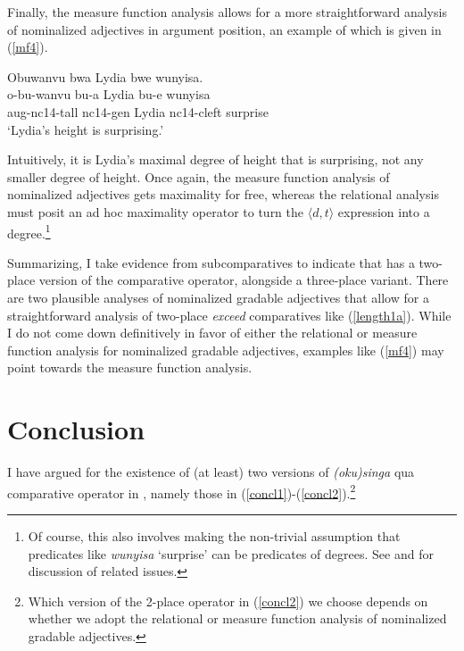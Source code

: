 \documentclass[output=paper,
modfonts
]{langscibook}
\begin{document}
Finally, the measure function analysis allows for a more straightforward analysis of nominalized adjectives in argument position, an example of which is given in (\ref{mf4}).



\begin{exe}
\ex\label{mf4}
\glll Obuwanvu bwa Lydia bwe wunyisa. \\
o-bu-wanvu bu-a Lydia bu-e wunyisa \\
{\sc aug-nc14}-tall {\sc nc14-gen} Lydia {\sc nc14-cleft} surprise \\
\glt `Lydia's height is surprising.'
\end{exe}


Intuitively, it is Lydia's maximal degree of height that is surprising, not any smaller degree of height. Once again, the measure function analysis of nominalized adjectives gets maximality for free, whereas the relational analysis must posit an ad hoc maximality operator to turn the $\langle d, t\rangle$ expression into a degree.\footnote{Of course, this also involves making the non-trivial assumption that predicates like {\it wunyisa} `surprise' can be predicates of degrees. See \citet{castroviejo08amazing} and \citet{moltmann09degree} for discussion of related issues.} 


Summarizing, I take evidence from subcomparatives to indicate that  has a two-place version of the comparative operator, alongside a three-place variant.  There are two plausible analyses of nominalized gradable adjectives that allow for a straightforward analysis of two-place {\it exceed} comparatives like (\ref{length1a}). While I do not come down definitively in favor of either the relational or measure function analysis for nominalized gradable adjectives, examples like (\ref{mf4}) may point towards the measure function analysis.
 



\section{Conclusion}\label{sec5}


I have argued for the existence of (at least) two versions of {\it (oku)singa} qua comparative operator in , namely those in (\ref{concl1})-(\ref{concl2}).\footnote{Which version of the 2-place operator in (\ref{concl2}) we choose depends on whether we adopt the relational or measure function analysis of nominalized gradable adjectives.}
\end{document}
